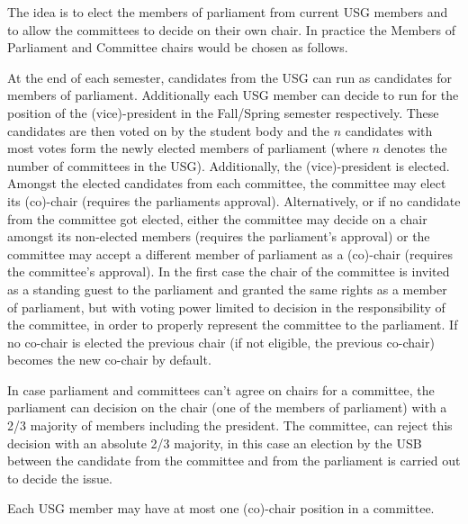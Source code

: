 The idea is to elect the members of parliament from current USG members and to allow the committees to decide on their own chair. 
In practice the Members of Parliament and Committee chairs would be chosen as follows. 

At the end of each semester, candidates from the USG can run as candidates for members of parliament. Additionally each USG member can decide to run for the position of the (vice)-president in the Fall/Spring semester respectively. These candidates are then voted on by the student body and the $n$ candidates with most votes form the newly elected members of parliament (where $n$ denotes the number of committees in the USG). Additionally, the (vice)-president is elected. Amongst the elected candidates from each committee, the committee may elect its (co)-chair (requires the parliaments approval). Alternatively, or if no candidate from the committee got elected, either the committee may decide on a chair amongst its non-elected members (requires the parliament's approval) or the committee may accept a different member of parliament as a (co)-chair (requires the committee's approval). In the first case the chair of the committee is invited as a standing guest to the parliament and granted the same rights as a member of parliament, but with voting power limited to decision in the responsibility of the committee, in order to properly represent the committee to the parliament. If no co-chair is elected the previous chair (if not eligible, the previous co-chair) becomes the new co-chair by default.

In case parliament and committees can't agree on chairs for a committee, the parliament can decision on the chair (one of the members of parliament) with a 2/3 majority of members including the president. The committee, can reject this decision with an absolute 2/3 majority, in this case an election by the USB between the candidate from the committee and from the parliament is carried out to decide the issue. 

Each USG member may have at most one (co)-chair position in a committee.